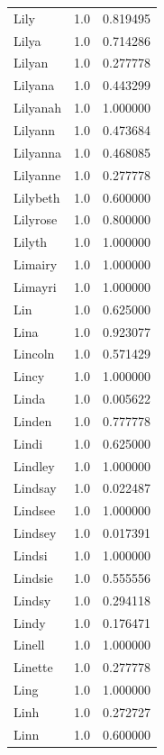 \documentclass[
  letterpaper,
  DIV=11,
  numbers=noendperiod]{scrreprt}
\begin{document}
\begin{tabular}{lrr}
Lily            &   1.0 &   0.819495 \\
Lilya           &   1.0 &   0.714286 \\
Lilyan          &   1.0 &   0.277778 \\
Lilyana         &   1.0 &   0.443299 \\
Lilyanah        &   1.0 &   1.000000 \\
Lilyann         &   1.0 &   0.473684 \\
Lilyanna        &   1.0 &   0.468085 \\
Lilyanne        &   1.0 &   0.277778 \\
Lilybeth        &   1.0 &   0.600000 \\
Lilyrose        &   1.0 &   0.800000 \\
Lilyth          &   1.0 &   1.000000 \\
Limairy         &   1.0 &   1.000000 \\
Limayri         &   1.0 &   1.000000 \\
Lin             &   1.0 &   0.625000 \\
Lina            &   1.0 &   0.923077 \\
Lincoln         &   1.0 &   0.571429 \\
Lincy           &   1.0 &   1.000000 \\
Linda           &   1.0 &   0.005622 \\
Linden          &   1.0 &   0.777778 \\
Lindi           &   1.0 &   0.625000 \\
Lindley         &   1.0 &   1.000000 \\
Lindsay         &   1.0 &   0.022487 \\
Lindsee         &   1.0 &   1.000000 \\
Lindsey         &   1.0 &   0.017391 \\
Lindsi          &   1.0 &   1.000000 \\
Lindsie         &   1.0 &   0.555556 \\
Lindsy          &   1.0 &   0.294118 \\
Lindy           &   1.0 &   0.176471 \\
Linell          &   1.0 &   1.000000 \\
Linette         &   1.0 &   0.277778 \\
Ling            &   1.0 &   1.000000 \\
Linh            &   1.0 &   0.272727 \\
Linn            &   1.0 &   0.600000 \\

\end{tabular}
\end{document}
